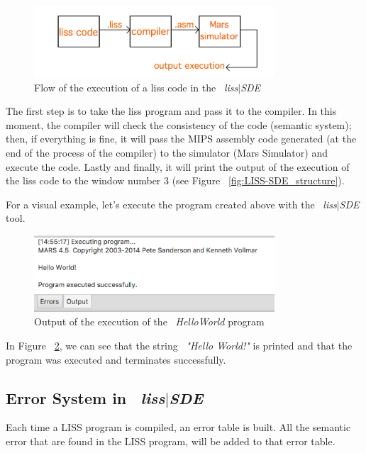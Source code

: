 \documentclass[
  oneside,
  11pt, a4paper,
  footinclude=true,
  headinclude=true,
  cleardoublepage=empty
]{scrbook}
\begin{document}
\begin{figure}[h!]
  \centering
    \includegraphics[width=0.8\textwidth]{img/executing_a_program.png}
    \caption{Flow of the execution of a liss code in the ~\textit{liss$|$SDE}}
    \label{fig:flow_execution_program}
\end{figure}
The first step is to take the liss program and pass it to the compiler. In this moment, the compiler will check the consistency of the code (semantic system); then, if everything is fine, it will pass the MIPS assembly code generated (at the end of the process of the compiler) to the simulator (Mars Simulator) and execute the code.
Lastly and finally, it will print the output of the execution of the liss code to the window number 3 (see Figure ~\ref{fig:LISS-SDE_structure}).

For a visual example, let's execute the program created above with the ~\textit{liss$|$SDE} tool.

\begin{figure}[h!]
  \centering
    \includegraphics[width=0.8\textwidth]{img/execution_of_the_program_liss_sde_hello_world.png}
    \caption{Output of the execution of the ~\textit{HelloWorld} program}
    \label{fig:helloWorld_execution_liss_sde}
\end{figure}

In Figure ~\ref{fig:helloWorld_execution_liss_sde}, we can see that the string ~\textit{"Hello World!"} is printed and that the program was executed and terminates successfully.

\subsection{Error System in ~\textit{liss$|$SDE}}

Each time a LISS program is compiled, an error table is built. All the semantic error that are found in the LISS program, will be added to that error table.
\end{document}
